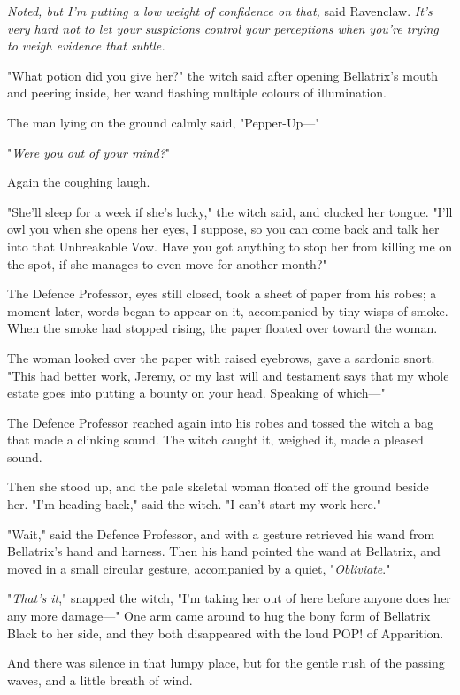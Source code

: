 \emph{Noted, but I'm putting a low weight of confidence on that,} said
Ravenclaw. \emph{It's very hard not to let your suspicions control your
perceptions when you're trying to weigh evidence that subtle.}

"What potion did you give her?" the witch said after opening Bellatrix's mouth
and peering inside, her wand flashing multiple colours of illumination.

The man lying on the ground calmly said, "Pepper-Up---"

"\emph{Were you out of your mind?}"

Again the coughing laugh.

"She'll sleep for a week if she's lucky," the witch said, and clucked her
tongue. "I'll owl you when she opens her eyes, I suppose, so you can come back
and talk her into that Unbreakable Vow. Have you got anything to stop her from
killing me on the spot, if she manages to even move for another month?"

The Defence Professor, eyes still closed, took a sheet of paper from his robes;
a moment later, words began to appear on it, accompanied by tiny wisps of
smoke. When the smoke had stopped rising, the paper floated over toward the
woman.

The woman looked over the paper with raised eyebrows, gave a sardonic snort.
"This had better work, Jeremy, or my last will and testament says that my whole
estate goes into putting a bounty on your head. Speaking of which---"

The Defence Professor reached again into his robes and tossed the witch a bag
that made a clinking sound. The witch caught it, weighed it, made a pleased
sound.

Then she stood up, and the pale skeletal woman floated off the ground beside
her. "I'm heading back," said the witch. "I can't start my work here."

"Wait," said the Defence Professor, and with a gesture retrieved his wand from
Bellatrix's hand and harness. Then his hand pointed the wand at Bellatrix, and
moved in a small circular gesture, accompanied by a quiet, "\emph{Obliviate}."

"\emph{That's it}," snapped the witch, "I'm taking her out of here before
anyone does her any more damage---" One arm came around to hug the bony form of
Bellatrix Black to her side, and they both disappeared with the loud POP! of
Apparition.

And there was silence in that lumpy place, but for the gentle rush of the
passing waves, and a little breath of wind.

